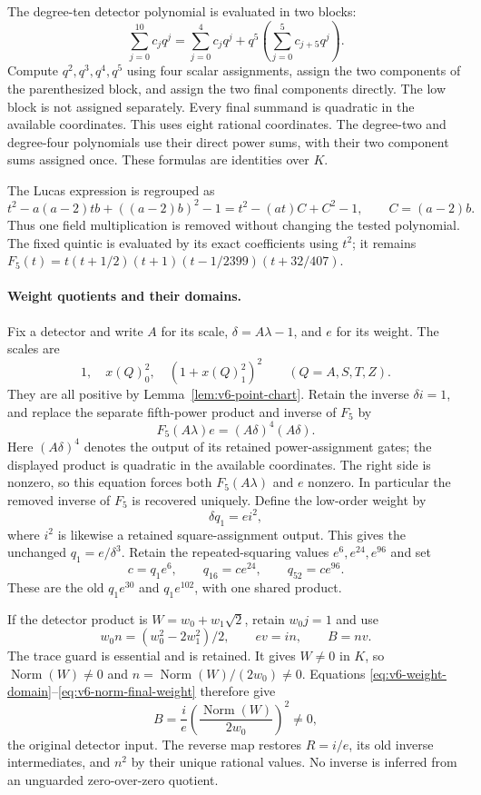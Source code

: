 The degree-ten detector polynomial is evaluated in two blocks:
\begin{equation}\label{eq:v6-detector-block-evaluation}
 \sum_{j=0}^{10}c_jq^j
 =\sum_{j=0}^{4}c_jq^j
   +q^5\left(\sum_{j=0}^{5}c_{j+5}q^j\right).
\end{equation}
Compute $q^2,q^3,q^4,q^5$ using four scalar assignments, assign the
two components of the parenthesized block, and assign the two final
components directly. The low block is not assigned separately.
Every final summand is quadratic in the available coordinates. This
uses eight rational coordinates. The degree-two and degree-four
polynomials use their direct power sums, with their two component
sums assigned once. These formulas are identities over $K$.

The Lucas expression is regrouped as
\[
 t^2-a(a-2)tb+((a-2)b)^2-1
 =t^2-(at)C+C^2-1,\qquad C=(a-2)b.
\]
Thus one field multiplication is removed without changing the tested
polynomial. The fixed quintic is evaluated by its exact coefficients
using $t^2$; it remains
$F_5(t)=t(t+1/2)(t+1)(t-1/2399)(t+32/407)$.

\paragraph{Weight quotients and their domains.}
Fix a detector and write $A$ for its scale, $\delta=A\lambda-1$,
and $e$ for its weight. The scales are
\[
 1,\quad x(Q)_0^2,\quad (1+x(Q)_1^2)^2
 \qquad(Q=A,S,T,Z).
\]
They are all positive by Lemma~\ref{lem:v6-point-chart}. Retain the
inverse $\delta i=1$, and replace the separate fifth-power product
and inverse of $F_5$ by
\begin{equation}\label{eq:v6-weight-domain}
 F_5(A\lambda)e=(A\delta)^4(A\delta).
\end{equation}
Here $(A\delta)^4$ denotes the output of its retained power-assignment
gates; the displayed product is quadratic in the available coordinates.
The right side is nonzero, so this equation forces both $F_5(A\lambda)$
and $e$ nonzero. In particular the removed inverse of $F_5$ is recovered
uniquely. Define the low-order weight by
\[
 \delta q_1=e i^2,
\]
where $i^2$ is likewise a retained square-assignment output. This gives
the unchanged $q_1=e/\delta^3$. Retain the repeated-squaring
values $e^6,e^{24},e^{96}$ and set
\[
 c=q_1e^6,\qquad q_{16}=ce^{24},\qquad q_{52}=ce^{96}.
\]
These are the old $q_1e^{30}$ and $q_1e^{102}$, with one shared product.

If the detector product is $W=w_0+w_1\sqrt2$, retain $w_0j=1$ and use
\begin{equation}\label{eq:v6-norm-final-weight}
 w_0n=(w_0^2-2w_1^2)/2,\qquad ev=in,\qquad B=nv.
\end{equation}
The trace guard is essential and is retained. It gives $W\ne0$ in $K$,
so $\operatorname{Norm}(W)\ne0$ and
$n=\operatorname{Norm}(W)/(2w_0)\ne0$. Equations
\eqref{eq:v6-weight-domain}--\eqref{eq:v6-norm-final-weight} therefore
give
\[
 B=\frac{i}{e}\left(\frac{\operatorname{Norm}(W)}{2w_0}\right)^2\ne0,
\]
the original detector input. The reverse map restores $R=i/e$, its
old inverse intermediates, and $n^2$ by their unique rational values.
No inverse is inferred from an unguarded zero-over-zero quotient.

